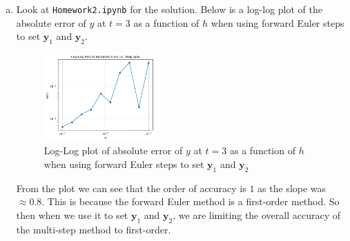 \documentclass{article}
\renewcommand{\vec}[1]{\mathbf{#1}}
\begin{document}
\begin{enumerate}[(a)]
        \item Look at \texttt{Homework2.ipynb} for the solution. Below is a log-log plot of the absolute error of $y$ at $t=3$ as a function of $h$ when using forward Euler steps to set $\vec{y}_1$ and $\vec{y}_2$. 
        \begin{figure}[H]
            \centering
            \includegraphics[width=0.4\textwidth]{Q3d.png}
            \caption{Log-Log plot of absolute error of $y$ at $t=3$ as a function of $h$ when using forward Euler steps to set $\vec{y}_1$ and $\vec{y}_2$}
        \end{figure}
        From the plot we can see that the order of accuracy is $1$ as the slope was $\approx 0.8$. This is because the forward Euler method is a first-order method. So then when we use it to set $\vec{y}_1$ and $\vec{y}_2$, we are limiting the overall accuracy of the multi-step method to first-order.
\end{enumerate}
\end{document}
